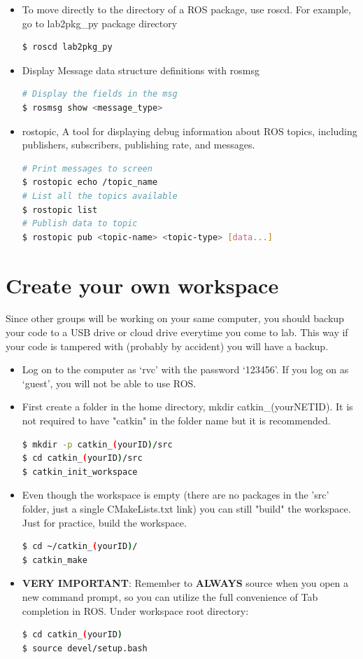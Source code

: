 \begin{itemize}
\item To move directly to the directory of a ROS package, use roscd. For example, go to lab2pkg\_py package directory
\begin{lstlisting}[language=bash]
$ roscd lab2pkg_py
\end{lstlisting}

\item Display Message data structure definitions with rosmsg
\begin{lstlisting}[language=bash]
# Display the fields in the msg
$ rosmsg show <message_type>
\end{lstlisting}

\item rostopic, A tool for displaying debug information about ROS topics,
including publishers, subscribers, publishing rate, and
messages.
\begin{lstlisting}[language=bash]
# Print messages to screen
$ rostopic echo /topic_name
# List all the topics available
$ rostopic list
# Publish data to topic
$ rostopic pub <topic-name> <topic-type> [data...]  
\end{lstlisting}
\end{itemize}

\section{Create your own workspace}
Since other groups will be working on your same computer, you should backup your code to a USB drive or cloud drive everytime you come to lab.  This way if 
your code is tampered with (probably by accident) you will have a backup.
\begin{itemize}
\item Log on to the computer as `rvc' with the password `123456'.  If you log on as `guest', you will not be able to use ROS.
\item First create a folder in the home directory, mkdir catkin\_(yourNETID).  It is not required to have "catkin" in the folder name but it is recommended.
\begin{lstlisting}[language=bash]
$ mkdir -p catkin_(yourID)/src
$ cd catkin_(yourID)/src
$ catkin_init_workspace
\end{lstlisting}
\item Even though the workspace is empty (there are no packages in the 'src' folder, just a single CMakeLists.txt link) you can still "build" the 
workspace. Just for practice, build the workspace.
\begin{lstlisting}[language=bash]
$ cd ~/catkin_(yourID)/
$ catkin_make
\end{lstlisting}
\item \textbf{VERY IMPORTANT}: Remember to \textbf{ALWAYS} source when you open a new command prompt, so you can utilize the full convenience of Tab completion in ROS.
Under workspace root directory:
\begin{lstlisting}[language=bash]
$ cd catkin_(yourID)
$ source devel/setup.bash
\end{lstlisting}
\end{itemize}

